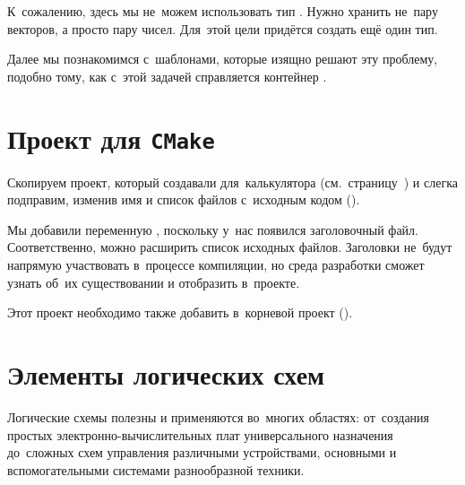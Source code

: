 
К~сожалению, здесь мы не~можем использовать тип . Нужно хранить не~пару векторов, а просто пару чисел. Для~этой цели придётся создать ещё один тип.


Далее мы познакомимся с~шаблонами, которые изящно решают эту проблему, подобно тому, как с~этой задачей справляется контейнер .



\section{Проект для \texttt{CMake}}
Скопируем проект, который создавали для~калькулятора (см.~страницу~\pageref{sect:calcproj}) и слегка подправим, изменив имя и список файлов с~исходным кодом ().


Мы добавили переменную , поскольку у~нас появился заголовочный файл. Соответственно, можно расширить список исходных файлов. Заголовки не~будут напрямую участвовать в~процессе компиляции, но среда разработки сможет узнать об~их существовании и отобразить в~проекте.


\noindent Этот проект необходимо также добавить в~корневой проект ().




\section{Элементы логических схем}
Логические схемы полезны и применяются во~многих областях: от~создания простых электронно-вычислительных плат универсального назначения до~сложных схем управления различными устройствами, основными и вспомогательными системами разнообразной техники.

